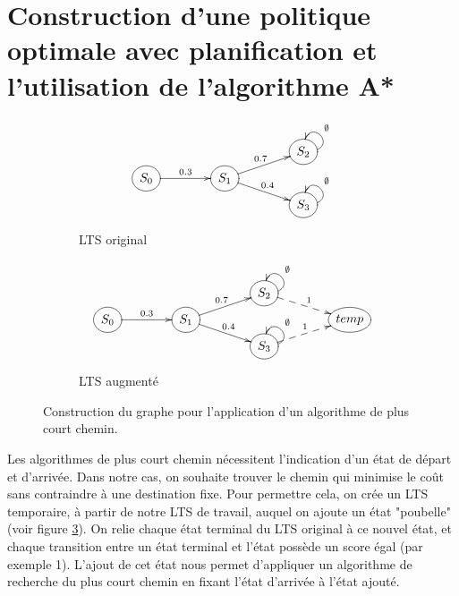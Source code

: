 \section{Construction d'une politique optimale avec planification et l'utilisation de l'algorithme A*}\label{astar}
\begin{figure}[h!]
    \centering
    \begin{subfigure}[b]{0.45\textwidth}
        \centering
        \[
            \xymatrix @R=0.1em@C=4em {
             & & *++[o][F-]{S_2}\ar@(r,u)[]_{\emptyset} 
             \\ *++[o][F-]{S_0} \ar[r]^{0.3}& *++[o][F-]{S_1} \ar[ru]^{0.7}  \ar[rd]^{0.4}   &
             \\ & &*++[o][F-]{S_3}\ar@(r,u)[]_{\emptyset} 
             }
        \]
        \caption{LTS original}
        \label{fig:diag-a}
    \end{subfigure}
    \hfill
    \begin{subfigure}[b]{0.45\textwidth}
        \centering
        \[
            \xymatrix @R=0.1em@C=4em {
             & & *++[o][F-]{S_2}\ar@(r,u)[]_{\emptyset} \ar@{-->} [rd]^{1} &
             \\ *++[o][F-]{S_0} \ar[r]^{0.3}& *++[o][F-]{S_1} \ar[ru]^{0.7}  \ar[rd]^{0.4}  &  & *++[o][F-]{temp}
             \\ & &*++[o][F-]{S_3}\ar@(r,u)[]_{\emptyset} \ar@{-->} [ru]^{1} &
             }
        \]
        \caption{LTS augmenté}
        \label{fig:diag-b}
    \end{subfigure}
    \caption{Construction du graphe pour l'application d'un algorithme de plus court chemin.}
    \label{fig:lts astar}
\end{figure}
Les algorithmes de plus court chemin nécessitent l'indication d'un état de départ et d'arrivée. Dans notre cas, on souhaite trouver le chemin qui minimise le coût sans contraindre à une destination fixe. Pour permettre cela, on crée un LTS temporaire, à partir de notre LTS de travail, auquel on ajoute un état "poubelle" (voir figure \ref{fig:lts astar}). On relie chaque état terminal du LTS original à ce nouvel état, et chaque transition entre un état terminal et l'état possède un score égal (par exemple 1). L'ajout de cet état nous permet d'appliquer un algorithme de recherche du plus court chemin en fixant l'état d'arrivée à l'état ajouté.

